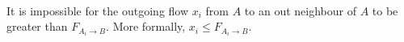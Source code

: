 \begin{lemma} \ \\
   \label{flowlimit}
   It is impossible for the outgoing flow $x_i$ from $A$ to an out neighbour of $A$ to be greater than
   $F_{A_i \rightarrow B}$. More formally, $x_i \leq F_{A_i \rightarrow B}$.
\end{lemma}
